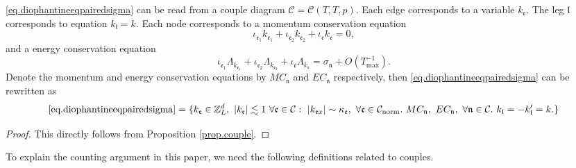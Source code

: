 \begin{prop}\label{prop.couple'}
\eqref{eq.diophantineeqpairedsigma} can be read from a couple diagram $\mathcal{C}=\mathcal{C}(T,T,p)$. Each edge corresponds to a variable $k_{\mathfrak{e}}$. The leg $\mathfrak{l}$ corresponds to equation $k_{\mathfrak{l}}=k$. Each node corresponds to a momentum conservation equation
\begin{equation}\label{eq.momentumconservationunit}
    \iota_{\mathfrak{e}_1}k_{\mathfrak{e}_1}+\iota_{\mathfrak{e}_2}k_{\mathfrak{e}_2}+\iota_{\mathfrak{e}}k_{\mathfrak{e}}=0,
\end{equation} 
and a energy conservation equation 
\begin{equation}\label{eq.energyconservationunit}
    \iota_{\mathfrak{e}_1}\Lambda_{k_{\mathfrak{e}_1}}+\iota_{\mathfrak{e}_2}\Lambda_{k_{\mathfrak{e}_2}}+\iota_{\mathfrak{e}}\Lambda_{k_{\mathfrak{e}}} = \sigma_{\mathfrak{n}} + O(T^{-1}_{\text{max}}).
\end{equation}  
Denote the momentum and energy conservation equations by $MC_{\mathfrak{n}}$ and $EC_{\mathfrak{n}}$ respectively, then \eqref{eq.diophantineeqpairedsigma} can be rewritten as 
\begin{equation}\label{eq.diophantineeqpairedsigma'}
    \text{\eqref{eq.diophantineeqpairedsigma}}=\{k_{\mathfrak{e}}\in \mathbb{Z}^d_L,\ |k_{\mathfrak{e}}|\lesssim 1\ \forall \mathfrak{e}\in \mathcal{C}:\  |k_{\mathfrak{e}x}| \sim \kappa_{\mathfrak{e}},\ \forall \mathfrak{e}\in \mathcal{C}_{\text{norm}}.\ MC_{\mathfrak{n}},\  EC_{\mathfrak{n}},\ \forall \mathfrak{n}\in \mathcal{C}.\ k_{\mathfrak{l}} = - k_{\mathfrak{l}}'= k.\}
\end{equation}
\end{prop}
\begin{proof}
This directly follows from Proposition \ref{prop.couple}. 
\end{proof}

To explain the counting argument in this paper, we need the following definitions related to couples.

